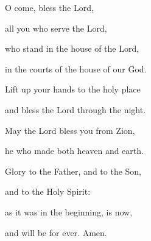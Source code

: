 \noindent O come, bless the Lord,~\GreStar{}~\nopagebreak

all you who serve the Lord,

\noindent who stand in the house of the Lord,~\GreStar{}~\nopagebreak

in the courts of the house of our God.

\noindent Lift up your hands to the holy place~\GreStar{}~\nopagebreak

and bless the Lord through the night.

\noindent May the Lord bless you from Zion,~\GreStar{}~\nopagebreak

he who made both heaven and earth.

\noindent Glory to the Father, and to the Son,~\GreStar{}~\nopagebreak

and to the Holy Spirit:

\noindent as it was in the beginning, is now,~\GreStar{}~\nopagebreak

and will be for ever. Amen.
